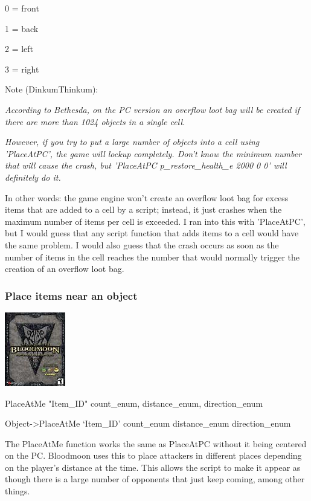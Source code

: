\documentclass[
]{article}
\begin{document}
0 = front

1 = back

2 = left

3 = right

Note (DinkumThinkum):

\emph{According to Bethesda, on the PC version an overflow loot bag will
be created if there are more than 1024 objects in a single cell.}

\emph{\hfill\break
However, if you try to put a large number of objects into a cell using
'PlaceAtPC', the game will lockup completely. Don't know the minimum
number that will cause the crash, but 'PlaceAtPC p\_restore\_health\_e
2000 0 0' will definitely do it.}%

In other words: the game engine won't create an overflow loot bag for
excess items that are added to a cell by a script; instead, it just
crashes when the maximum number of items per cell is exceeded. I ran
into this with 'PlaceAtPC', but I would guess that any script function
that adds items to a cell would have the same problem. I would also
guess that the crash occurs as soon as the number of items in the cell
reaches the number that would normally trigger the creation of an
overflow loot bag.

\hypertarget{place-items-near-an-object}{%
\subsubsection{Place items near an
object}\label{place-items-near-an-object}}

\includegraphics{media/image7.png}

PlaceAtMe "Item\_ID" count\_enum, distance\_enum, direction\_enum

Object-\textgreater PlaceAtMe `Item\_ID' count\_enum distance\_enum
direction\_enum

The PlaceAtMe function works the same as PlaceAtPC without it being
centered on the PC. Bloodmoon uses this to place attackers in different
places depending on the player's distance at the time. This allows the
script to make it appear as though there is a large number of opponents
that just keep coming, among other things.
\end{document}
